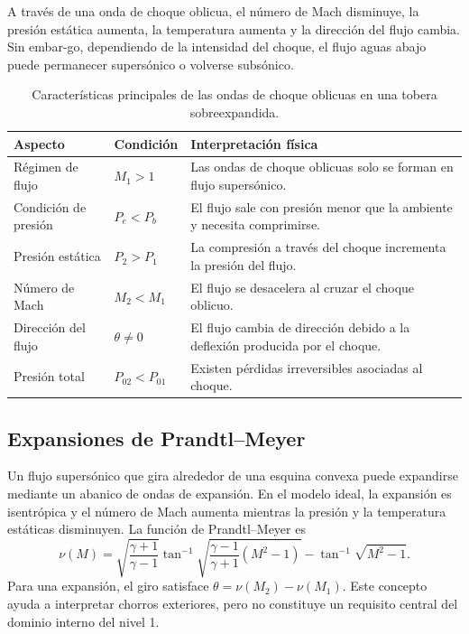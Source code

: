 \documentclass[12pt,letterpaper]{article}
\numberwithin{equation}{section}
\begin{document}
A través de una onda de choque oblicua, el número de Mach disminuye, la presión estática aumenta, la temperatura aumenta y la dirección del flujo cambia. Sin embar-go, dependiendo de la intensidad del choque, el flujo aguas abajo puede permanecer supersónico o volverse subsónico.


\begin{table}[H]
\centering
\caption{Características principales de las ondas de choque oblicuas en una tobera sobreexpandida.}
\label{tab:choque_oblicuo}
\renewcommand{\arraystretch}{1.3}
\small
\begin{tabular}{
>{\centering\arraybackslash}p{3.0cm}
>{\centering\arraybackslash}p{2.5cm}
p{7.2cm}
}
\toprule
\textbf{Aspecto} &
\textbf{Condición} &
\textbf{Interpretación física} \\
\midrule
Régimen de flujo &
$M_1 > 1$ &
Las ondas de choque oblicuas solo se forman
en flujo supersónico. \\
Condición de presión &
$P_e < P_b$ &
El flujo sale con presión menor que la
ambiente y necesita comprimirse. \\
Presión estática &
$P_2 > P_1$ &
La compresión a través del choque
incrementa la presión del flujo. \\
Número de Mach &
$M_2 < M_1$ &
El flujo se desacelera al cruzar
el choque oblicuo. \\
Dirección del flujo &
$\theta \neq 0$ &
El flujo cambia de dirección debido
a la deflexión producida por el choque. \\
Presión total &
$P_{02} < P_{01}$ &
Existen pérdidas irreversibles
asociadas al choque. \\
\bottomrule
\end{tabular}
\end{table}

\subsection{Expansiones de Prandtl--Meyer}
Un flujo supersónico que gira alrededor de una esquina convexa puede expandirse mediante un abanico de ondas de expansión. En el modelo ideal, la expansión es isentrópica y el número de Mach aumenta mientras la presión y la temperatura estáticas disminuyen. La función de Prandtl--Meyer es
\begin{equation}
\nu(M)=\sqrt{\frac{\gamma+1}{\gamma-1}}\tan^{-1}\sqrt{\frac{\gamma-1}{\gamma+1}(M^2-1)}-\tan^{-1}\sqrt{M^2-1}.
\end{equation}
Para una expansión, el giro satisface $\theta=\nu(M_2)-\nu(M_1)$. Este concepto ayuda a interpretar chorros exteriores, pero no constituye un requisito central del dominio interno del nivel 1.
\end{document}
